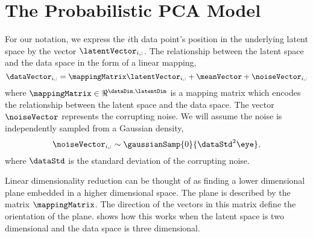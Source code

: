 \section{The Probabilistic PCA Model}

For our notation, we express the $i$th data point's position in the
underlying latent space by the vector $\latentVector_{i, :}$. The
relationship between the latent space and the data space in the form
of a linear mapping,
\[
\dataVector_{i, :} = \mappingMatrix \latentVector_{i, :} + \meanVector
+ \noiseVector_{i, :}
\]
where $\mappingMatrix \in \Re^{\dataDim,\latentDim}$ is a mapping
matrix which encodes the relationship between the latent space and the
data space. The vector $\noiseVector$ represents the corrupting
noise. We will assume the noise is independently sampled from a
Gaussian density,
\[
\noiseVector_{i,:} \sim \gaussianSamp{0}{\dataStd^2\eye},
\]
where $\dataStd$ is the standard deviation of the corrupting noise. 

Linear dimensionality reduction can be thought of as finding a lower
dimensional plane embedded in a higher dimensional space. The plane is
described by the matrix $\mappingMatrix$. The direction of the vectors
in this matrix define the orientation of the
plane.  shows how this works when
the latent space is two dimensional and the data space is three
dimensional.


